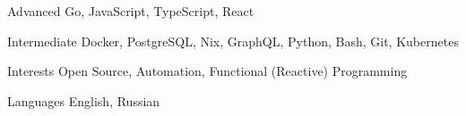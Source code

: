 
\begin{cvskills}

  \cvskill
    {Advanced}
    {Go, JavaScript, TypeScript, React}

    \cvskill
    {Intermediate}
    {Docker, PostgreSQL, Nix, GraphQL, Python, Bash, Git, Kubernetes}

   \cvskill
    {Interests}
    {Open Source, Automation, Functional (Reactive) Programming}

  \cvskill
    {Languages}
    {English, Russian}

\end{cvskills}